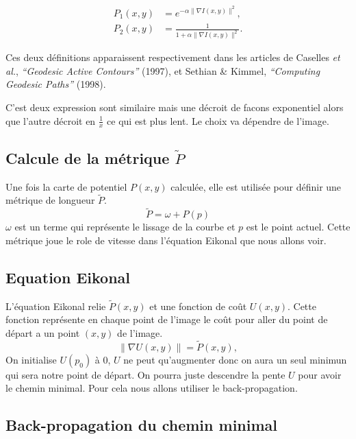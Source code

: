 \documentclass{article}
\begin{document}
\begin{equation}
\begin{aligned}
P_1(x,y) &= e^{-\alpha \|\nabla I(x,y)\|^2}, \\
P_2(x,y) &= \frac{1}{1 + \alpha \|\nabla I(x,y)\|^2}.
\end{aligned}
\end{equation}

Ces deux définitions apparaissent respectivement dans les articles de  
Caselles \textit{et al.}, \textit{“Geodesic Active Contours”} (1997), et  
Sethian \& Kimmel, \textit{“Computing Geodesic Paths”} (1998).

C'est deux expression sont similaire mais une décroit de facons exponentiel 
alors que l'autre décroit en $\frac{1}{x}$ ce qui est plus lent. Le choix va
dépendre de l'image. 

\subsection{Calcule de la métrique $\tilde{P}$}
Une fois la carte de potentiel $P(x,y)$ calculée, elle est utilisée pour définir 
une métrique de longueur $\tilde{P}$. 
\begin{equation}
\tilde{P} = \omega + P(p)
\end{equation}
$\omega$ est un terme qui représente le lissage de la courbe et $p$ est le point actuel.
Cette métrique joue le role de vitesse dans l'équation Eikonal que nous allons voir. 


\subsection{Equation Eikonal}
L'équation Eikonal relie $\tilde{P}(x,y)$ et une fonction de coût $U(x,y)$. Cette fonction
représente en chaque point de l'image le coût pour aller du point de départ a un point $(x,y)$
de l'image.
\begin{equation}
\|\nabla U(x,y)\| = \tilde{P}(x,y),
\end{equation}
On initialise $U(p_0)$ à $0$, $U$ ne peut qu'augmenter donc on aura un seul minimun qui sera
notre point de départ. On pourra juste descendre la pente $U$ pour avoir le chemin minimal.
Pour cela nous allons utiliser le back-propagation.

\subsection{Back-propagation du chemin minimal}
\end{document}
